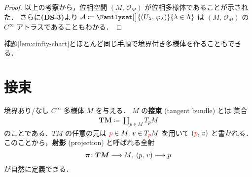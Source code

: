 \documentclass[TQFT_main]{subfiles}
\begin{document}
\begin{proof}
    以上の考察から，位相空間 $(M,\, \mathscr{O}_M)$ が位相多様体であることが示された．
	さらに\textsf{\textbf{(DS-3)}}より $\mathcal{A} \coloneqq \Familyset[\big]{(U_\lambda,\, \varphi_\lambda)}{\lambda \in \Lambda}$ は $(M,\, \mathscr{O}_M)$ の $C^\infty$ アトラスであることもわかる．


	
\end{proof}

補題\ref{lem:cinfty-chart}とほとんど同じ手順で境界付き多様体を作ることもできる．

\section{接束}

境界あり/なし $C^\infty$ 多様体 $M$ を与える．
$M$ の\textbf{接束} (tangent bundle) とは
集合
\begin{align}
    \bm{TM} \coloneqq \coprod_{p \in M} T_p M
\end{align}
のことである．$TM$ の任意の元は $\textcolor{red}{p} \in M,\, v \in T_{\textcolor{red}{p}} M$ を用いて $(\textcolor{red}{p},\, v)$ と書かれる．
このことから，\textbf{射影} (projection) と呼ばれる全射
\begin{align}
    \bm{\pi} \colon \bm{TM} \longrightarrow M,\; (p,\, v) \longmapsto p
\end{align}
が自然に定義できる．
\end{document}
